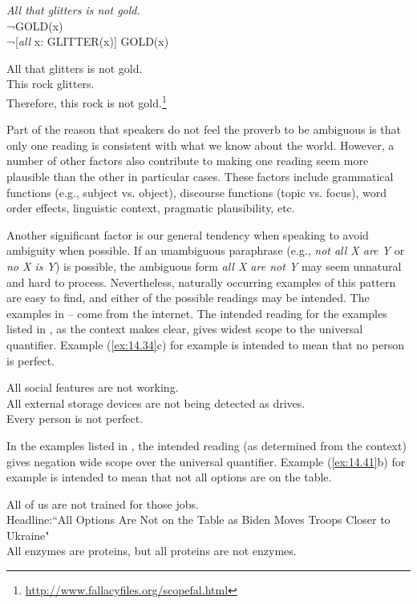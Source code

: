 \ea \label{ex:14.32}
\textit{All that glitters is not gold.}\\
 ¬GOLD(x)\\
\ex  ¬[\textit{all} x: GLITTER(x)] GOLD(x)
                       \z
\z

\ea \label{ex:14.33}
All that glitters is not gold.\\
This rock glitters.\\
Therefore, this rock is not gold.\footnote{\url{http://www.fallacyfiles.org/scopefal.html}}
\z


Part of the reason that speakers do not feel the proverb to be ambiguous is that only one reading is consistent with what we know about the world. However, a number of other factors also contribute to making one reading seem more plausible than the other in particular cases. These factors include grammatical functions (e.g., subject vs. object), discourse functions (topic vs. focus), word order effects, linguistic context, pragmatic plausibility, etc.

Another significant factor is our general tendency when speaking to avoid ambiguity when possible. If an unambiguous paraphrase (e.g., \textit{not all X are Y} or \textit{no  X is Y}) is possible, the ambiguous form \textit{all X are not Y} may seem unnatural and hard to process. Nevertheless, naturally occurring examples of this pattern are easy to find, and either of the possible readings may be intended. The examples in -- come from the internet. The intended reading for the examples listed in , as the context makes clear, gives widest scope to the universal quantifier. Example (\ref{ex:14.34}c) for example is intended to mean that no person is perfect.


\ea \label{ex:14.34}
\ea All social features are not working.\\
\ex All external storage devices are not being detected as drives.\\
\ex Every person is not perfect.
                       \z
\z


In the examples listed in , the intended reading (as determined from the context) gives negation wide scope over the universal quantifier. Example (\ref{ex:14.41}b) for example is intended to mean that not all options are on the table.


\ea \label{ex:14.41}
\ea All of us are not trained for those jobs.\\
\ex Headline:``All Options Are Not on the Table as Biden Moves Troops Closer to Ukraine"\\
\ex All enzymes are proteins, but all proteins are not enzymes.
                       \z
\z



